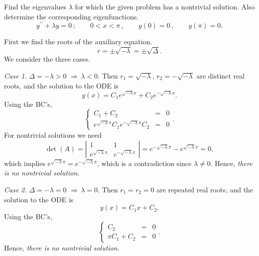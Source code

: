 \documentclass[11pt]{article}
\begin{document}
\begin{problem}
Find the eigenvalues $\lambda$ for which the given problem has a nontrivial solution. Also determine the corresponding eigenfunctions.
\begin{equation*}
y^{\prime \prime} + \lambda y =0\,; \qquad  0<x<\pi \,, \qquad y(0)=0  \,,\qquad y(\pi) =0. 
\end{equation*}
\end{problem}
\begin{solution}
First we find the roots of the auxiliary equation.
\[r=\pm\sqrt{-\lambda}=\pm\sqrt{\Delta}.\]
We consider the three cases.

\par \textsl{Case 1.} $\Delta = -\lambda >0 \,\, \Rightarrow \, \lambda<0.$ Then $r_{1}=\sqrt{-\lambda}$, $r_{2}=-\sqrt{-\lambda}$ are distinct real roots, and the solution to the ODE is
\[y(x)=C_{1}e^{\sqrt{-\lambda}x}+C_{2}e^{-\sqrt{-\lambda}x}.\]
Using the BC's,
\begin{equation*}
\left\{\begin{array}{rcl}
       C_{1} +C_{2}&=&0\\
      e^{\sqrt{-\lambda}\pi}C_{1}  e^{-\sqrt{-\lambda}\pi}C_{2}& = &0
      \end{array}\right. .
\end{equation*}
For nontrivial solutions we need 
$$\det(A)=\left|\begin{matrix}1&1\\ e^{\sqrt{-\lambda}\pi} & e^{-\sqrt{-\lambda}\pi}\end{matrix}\right|=e^{-\sqrt{-\lambda}\pi}-e^{\sqrt{-\lambda}\pi}=0,$$ 
which implies $e^{\sqrt{-\lambda}\pi}=e^{-\sqrt{-\lambda}\pi}$, which is a contradiction since $\lambda\neq 0$. Hence, \textsl{there is no nontrivial solution}.

\par \textsl{Case 2.} $\Delta = -\lambda =0 \,\, \Rightarrow \, \lambda=0.$ Then $r_{1}=r_{2}=0$ are repeated real roots, and the solution to the ODE is
\[y(x)=C_{1}x+C_{2}.\]
Using the BC's,
\begin{equation*}
\left\{\begin{array}{rcl}
       C_{2} & = & 0\\
       \pi C_{1} + C_{2} & = & 0
      \end{array}\right. .
\end{equation*}
Hence, \textsl{there is no nontrivial solution}.


\end{solution}
\end{document}
